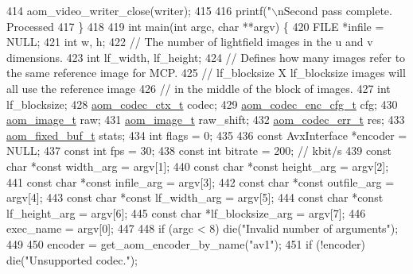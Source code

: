 \begin{DoxyCodeInclude}
{{{{{{{{{414   aom\_video\_writer\_close(writer);
415 
416   printf(\textcolor{stringliteral}{"\(\backslash\)nSecond pass complete. Processed %
417 \}
418 
419 \textcolor{keywordtype}{int} main(\textcolor{keywordtype}{int} argc, \textcolor{keywordtype}{char} **argv) \{
420   FILE *infile = NULL;
421   \textcolor{keywordtype}{int} w, h;
422   \textcolor{comment}{// The number of lightfield images in the u and v dimensions.}
423   \textcolor{keywordtype}{int} lf\_width, lf\_height;
424   \textcolor{comment}{// Defines how many images refer to the same reference image for MCP.}
425   \textcolor{comment}{// lf\_blocksize X lf\_blocksize images will all use the reference image}
426   \textcolor{comment}{// in the middle of the block of images.}
427   \textcolor{keywordtype}{int} lf\_blocksize;
428   \hyperlink{structaom__codec__ctx}{aom\_codec\_ctx\_t} codec;
429   \hyperlink{structaom__codec__enc__cfg}{aom\_codec\_enc\_cfg\_t} cfg;
430   \hyperlink{structaom__image}{aom\_image\_t} raw;
431   \hyperlink{structaom__image}{aom\_image\_t} raw\_shift;
432   \hyperlink{group__codec_gaaae61e0f8663e6137f1e228757248e7c}{aom\_codec\_err\_t} res;
433   \hyperlink{structaom__fixed__buf}{aom\_fixed\_buf\_t} stats;
434   \textcolor{keywordtype}{int} flags = 0;
435 
436   \textcolor{keyword}{const} AvxInterface *encoder = NULL;
437   \textcolor{keyword}{const} \textcolor{keywordtype}{int} fps = 30;
438   \textcolor{keyword}{const} \textcolor{keywordtype}{int} bitrate = 200;  \textcolor{comment}{// kbit/s}
439   \textcolor{keyword}{const} \textcolor{keywordtype}{char} *\textcolor{keyword}{const} width\_arg = argv[1];
440   \textcolor{keyword}{const} \textcolor{keywordtype}{char} *\textcolor{keyword}{const} height\_arg = argv[2];
441   \textcolor{keyword}{const} \textcolor{keywordtype}{char} *\textcolor{keyword}{const} infile\_arg = argv[3];
442   \textcolor{keyword}{const} \textcolor{keywordtype}{char} *\textcolor{keyword}{const} outfile\_arg = argv[4];
443   \textcolor{keyword}{const} \textcolor{keywordtype}{char} *\textcolor{keyword}{const} lf\_width\_arg = argv[5];
444   \textcolor{keyword}{const} \textcolor{keywordtype}{char} *\textcolor{keyword}{const} lf\_height\_arg = argv[6];
445   \textcolor{keyword}{const} \textcolor{keywordtype}{char} *lf\_blocksize\_arg = argv[7];
446   exec\_name = argv[0];
447 
448   \textcolor{keywordflow}{if} (argc < 8) die(\textcolor{stringliteral}{"Invalid number of arguments"});
449 
450   encoder = get\_aom\_encoder\_by\_name(\textcolor{stringliteral}{"av1"});
451   \textcolor{keywordflow}{if} (!encoder) die(\textcolor{stringliteral}{"Unsupported codec."});
}}}}}}}}}}
\end{DoxyCodeInclude}
